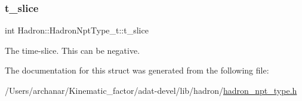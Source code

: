 \subsubsection{\texorpdfstring{t\_slice}{t\_slice}}
{\footnotesize\ttfamily int Hadron\+::\+Hadron\+Npt\+Type\+\_\+t\+::t\+\_\+slice}

The time-\/slice. This can be negative. 

The documentation for this struct was generated from the following file\+:\begin{DoxyCompactItemize}
\item 
/\+Users/archanar/\+Kinematic\+\_\+factor/adat-\/devel/lib/hadron/\mbox{\hyperlink{adat-devel_2lib_2hadron_2hadron__npt__type_8h}{hadron\+\_\+npt\+\_\+type.\+h}}\end{DoxyCompactItemize}
